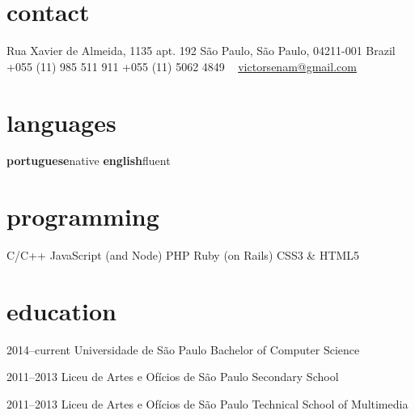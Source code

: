 \documentclass[]{friggeri-cv} %
\begin{document}


\begin{aside} %
\section{contact}
Rua Xavier de Almeida, 1135 apt. 192
São Paulo, São Paulo, 04211-001
Brazil
~
+055 (11) 985 511 911
+055 (11) 5062 4849
~
\href{mailto:victorsenam@gmail.com}{victorsenam@gmail.com}
\section{languages}
\textbf{portuguese}\hfill native
\textbf{english}\hfill fluent
\section{programming}
C/C++
JavaScript (and Node)
PHP
Ruby (on Rails)
CSS3 \& HTML5
\end{aside}


\section{education}

\begin{entrylist}


\entry
{2014--current}
{Universidade de São Paulo}
{Bachelor of Computer Science}

\entry
{2011--2013}
{Liceu de Artes e Ofícios de São Paulo}
{Secondary School}

\entry
{2011--2013}
{Liceu de Artes e Ofícios de São Paulo}
{Technical School of Multimedia}


\end{entrylist}
\end{document}
